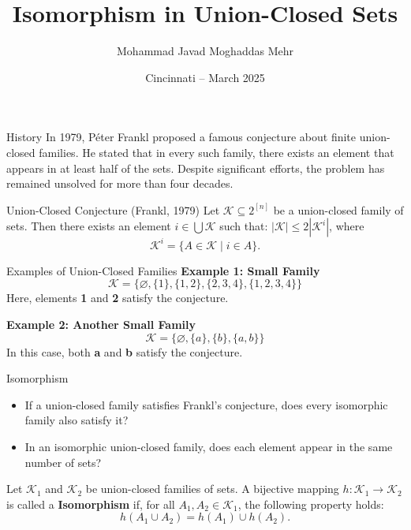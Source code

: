 \documentclass{beamer}
\title{Isomorphism in Union-Closed Sets}
\author{Mohammad Javad Moghaddas Mehr}
\institute{Bowling Green State University}
\date{Cincinnati – March 2025}
\begin{document}
\begin{frame}
	\titlepage
\end{frame}

\begin{frame}{History}
	In 1979, Péter Frankl proposed a famous conjecture about finite union-closed families.
	He stated that in every such family, there exists an element that appears in at least half of the sets.
	Despite significant efforts, the problem has remained unsolved for more than four decades.
	\vfill
	\pause
	\begin{block}{Union-Closed Conjecture (Frankl, 1979)}
		Let \(\mathcal{K} \subseteq 2^{[n]}\) be a union-closed family of sets.
		Then there exists an element \(i \in \bigcup \mathcal{K}\) such that: \(|\mathcal{K}| \leq 2|\mathcal{K}^i|\),
		where
		\[
			\mathcal{K}^i = \{A \in \mathcal{K} \mid i \in A\}.
		\]
	\end{block}

\end{frame}



\begin{frame}{Examples of Union-Closed Families}
	\textbf{Example 1: Small Family}
	\[
		\mathcal{K} = \{\varnothing, \{1\}, \{1,2\}, \{2,3,4\}, \{1,2,3,4\}\}
	\]
	Here, elements \textbf{1} and \textbf{2} satisfy the conjecture.

	\vfill
	\pause

	\textbf{Example 2: Another Small Family}
	\[
		\mathcal{K} = \{\varnothing, \{a\}, \{b\}, \{a,b\}\}
	\]
	In this case, both \textbf{a} and \textbf{b} satisfy the conjecture.
\end{frame}


\begin{frame}{Isomorphism}
	\begin{itemize}
		\item 	If a union-closed family satisfies Frankl’s conjecture, does every isomorphic family also satisfy it?
		      \pause
		\item  In an isomorphic union-closed family, does each element appear in the same number of sets?

	\end{itemize}

	\vfill
	\pause
	\begin{Definition}
		Let \( \mathcal{K}_1 \) and \( \mathcal{K}_2 \) be union-closed families of sets.
		A bijective mapping \( h: \mathcal{K}_1 \to \mathcal{K}_2 \) is called a \textbf{Isomorphism} if, for all
		\( A_1, A_2 \in \mathcal{K}_1 \), the following property holds:
		\[
			h(A_1 \cup A_2) = h(A_1) \cup h(A_2).
		\]
	\end{Definition}
\end{frame}
\end{document}
